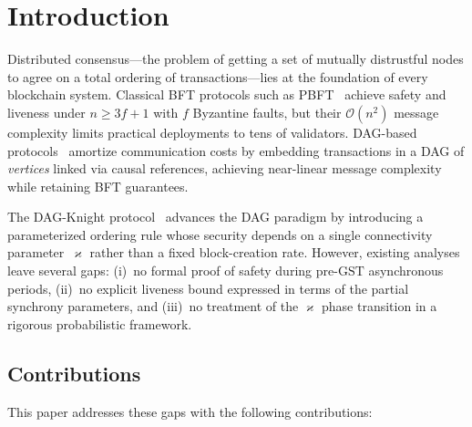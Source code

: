 \documentclass[11pt,a4paper]{article}
\theoremstyle{definition}
\theoremstyle{remark}
\newcommand{\DK}{\textsf{DAG-Knight}}
\newcommand{\GST}{\mathrm{GST}}
\renewcommand{\kappa}{\varkappa}
\newcommand{\bigO}{\mathcal{O}}
\begin{document}
\tableofcontents
\newpage

\section{Introduction}\label{sec:intro}

Distributed consensus---the problem of getting a set of mutually distrustful
nodes to agree on a total ordering of transactions---lies at the foundation
of every blockchain system.
Classical BFT protocols such as PBFT~\cite{castro1999pbft} achieve safety
and liveness under $n \geq 3f+1$ with $f$ Byzantine faults, but their
$\bigO(n^2)$ message complexity limits practical deployments to tens of
validators.
DAG-based protocols~\cite{sompolinsky2021phantom,sompolinsky2018spectre}
amortize communication costs by embedding transactions in a DAG of
\emph{vertices} linked via causal references, achieving near-linear
message complexity while retaining BFT guarantees.

The \DK{} protocol~\cite{sompolinsky2022dagknight} advances the DAG
paradigm by introducing a parameterized ordering rule whose security
depends on a single connectivity parameter~$\kappa$ rather than a fixed
block-creation rate.
However, existing analyses~\cite{sompolinsky2022dagknight} leave several
gaps: (i)~no formal proof of safety during pre-$\GST$ asynchronous periods,
(ii)~no explicit liveness bound expressed in terms of the partial synchrony
parameters, and (iii)~no treatment of the $\kappa$ phase transition in a
rigorous probabilistic framework.

\subsection{Contributions}

This paper addresses these gaps with the following contributions:
\end{document}
